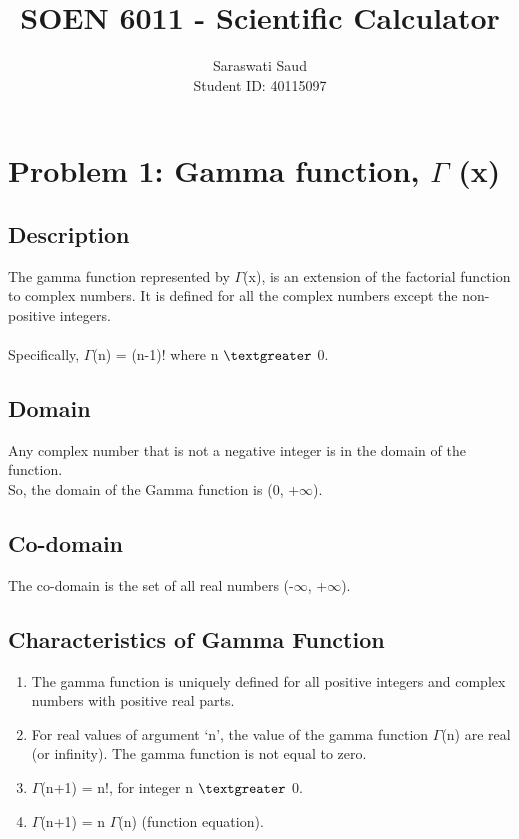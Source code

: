 \documentclass[a4paper,12pt]{article}
\title{SOEN 6011 - Scientific Calculator}
\author{Saraswati Saud \\
Student ID: 40115097}
\date{}
\begin{document}
\maketitle
\section{Problem 1: Gamma function, $\Gamma$ (x)}
    \subsection{Description}
    The gamma function represented by $\Gamma$(x), is an extension of the factorial function to complex numbers. It is defined for all the complex numbers except the non-positive integers.\\ \\
    Specifically, $\Gamma$(n) = (n-1)! where n $\textgreater$ 0.

    \subsection{Domain}
    Any complex number that is not a negative integer is in the domain of the function.\\
    So, the domain of the Gamma function is (0, +$\infty$).
    
    \subsection{Co-domain}
    The co-domain is the set of all real numbers (-$\infty$, +$\infty$).
    
    \subsection{Characteristics of Gamma Function}
    \begin{enumerate}
        \item The gamma function is uniquely defined for all positive integers and complex numbers with positive real parts.
        \item For real values of argument ‘n’, the value of the gamma function $\Gamma$(n) are real (or infinity). The gamma function is not equal to zero.
        \item $\Gamma$(n+1) = n!, for integer n $\textgreater$ 0.
        \item $\Gamma$(n+1) = n $\Gamma$(n) (function equation).
    \end{enumerate}
    
\end{document}
